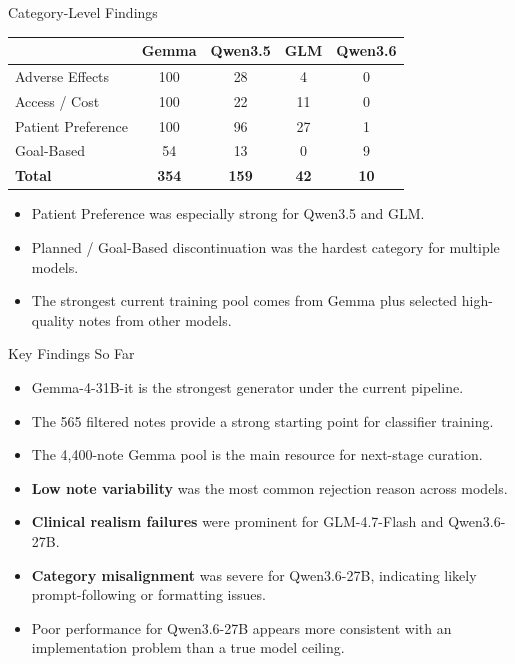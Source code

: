 \documentclass[aspectratio=169]{beamer}
\begin{document}
\begin{frame}{Category-Level Findings}
    \small
    \begin{table}
        \centering
        \begin{tabular}{lcccc}
            \toprule
             & \textbf{Gemma} & \textbf{Qwen3.5} & \textbf{GLM} & \textbf{Qwen3.6} \\
            \midrule
            Adverse Effects & 100 & 28 & 4 & 0 \\
            Access / Cost & 100 & 22 & 11 & 0 \\
            Patient Preference & 100 & 96 & 27 & 1 \\
            Goal-Based & 54 & 13 & 0 & 9 \\
            \midrule
            \textbf{Total} & \textbf{354} & \textbf{159} & \textbf{42} & \textbf{10} \\
            \bottomrule
        \end{tabular}
    \end{table}

    \begin{itemize}
        \item Patient Preference was especially strong for Qwen3.5 and GLM.
        \item Planned / Goal-Based discontinuation was the hardest category for multiple models.
        \item The strongest current training pool comes from Gemma plus selected high-quality notes from other models.
    \end{itemize}
\end{frame}

\begin{frame}{Key Findings So Far}
    \begin{itemize}
        \item Gemma-4-31B-it is the strongest generator under the current pipeline.
        \item The 565 filtered notes provide a strong starting point for classifier training.
        \item The 4,400-note Gemma pool is the main resource for next-stage curation.
        \item \textbf{Low note variability} was the most common rejection reason across models.
        \item \textbf{Clinical realism failures} were prominent for GLM-4.7-Flash and Qwen3.6-27B.
        \item \textbf{Category misalignment} was severe for Qwen3.6-27B, indicating likely prompt-following or formatting issues.
        \item Poor performance for Qwen3.6-27B appears more consistent with an implementation problem than a true model ceiling.
    \end{itemize}
\end{frame}
\end{document}

